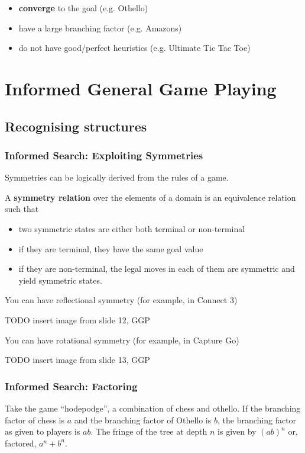 \begin{itemize}
    \item \textbf{converge} to the goal (e.g. Othello)
    \item have a large branching factor (e.g. Amazons)
    \item do not have good/perfect heuristics (e.g. Ultimate Tic Tac Toe)
\end{itemize}

\section{Informed General Game Playing}
\subsection{Recognising structures}
\subsubsection{Informed Search: Exploiting Symmetries}
Symmetries can be logically derived from the rules of a game.

A \textbf{symmetry relation} over the elements of a domain is an equivalence
relation such that
\begin{itemize}
    \item two symmetric states are either both terminal or non-terminal
    \item if they are terminal, they have the same goal value
    \item if they are non-terminal, the legal moves in each of them are
        symmetric and yield symmetric states.
\end{itemize}

You can have reflectional symmetry (for example, in Connect 3)

TODO insert image from slide 12, GGP

You can have rotational symmetry (for example, in Capture Go)

TODO insert image from slide 13, GGP

\subsubsection{Informed Search: Factoring}
Take the game ``hodepodge'', a combination of chess and othello. If the
branching factor of chess is $a$ and the branching factor of Othello is $b$,
the branching factor as given to players is $ab$. The fringe of the tree at
depth $n$ is given by $(ab)^n$ or, factored, $a^n + b^n$.

